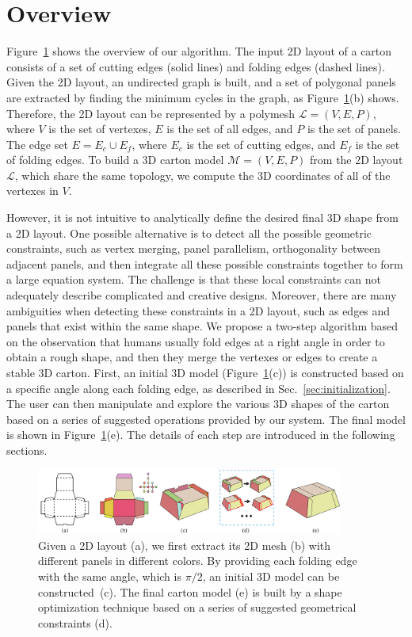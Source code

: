 \section{Overview}\label{sec:overview}


Figure~\ref{fig:overview} shows the overview of our algorithm. 
The input 2D layout of a carton consists of a set of cutting edges (solid lines) and folding edges (dashed lines).
%
Given the 2D layout, an undirected graph is built, and a set of polygonal panels are extracted by finding the minimum cycles in the graph, as Figure~\ref{fig:overview}(b) shows. 
Therefore, the 2D layout can be represented by a polymesh $\mathcal{L}=(V,E,P)$, where $V$ is the set of vertexes, $E$ is the set of all edges, and $P$ is the set of panels. 
The edge set $E=E_c\cup E_f$, where $E_c$ is the set of cutting edges, and $E_f$ is the set of folding edges.
%
To build a 3D carton model $\mathcal{M}=(V, E, P)$ from the 2D layout $\mathcal{L}$, which share the same topology, we compute the 3D coordinates of all of the vertexes in $V$. 
%

However, it is not intuitive to analytically define the desired final 3D shape from a 2D layout. 
One possible alternative is to detect all the possible geometric constraints, such as vertex merging, panel parallelism, orthogonality between adjacent panels, and then integrate all these possible constraints together to form a large equation system. 
The challenge is that these local constraints can not adequately describe complicated and creative designs. 
Moreover, there are many ambiguities when detecting these constraints in a 2D layout, such as edges and panels that exist within the same shape. 
%
We propose a two-step algorithm based on the observation that humans usually fold edges at a right angle in order to obtain a rough shape, and then they merge the vertexes or edges to create a stable 3D carton.
First, an initial 3D model (Figure~\ref{fig:overview}(c)) is constructed based on a specific angle along each folding edge, as described in Sec.~\ref{sec:initialization}.
The user can then manipulate and explore the various 3D shapes of the carton based on a series of suggested operations provided by our system. 
%
The final model is shown in Figure~\ref{fig:overview}(e).
The details of each step are introduced in the following sections. 
 
\begin{figure}
	\centering
	\includegraphics[width=0.9\textwidth]{images/overview}
	\caption{Given a 2D layout (a), we first extract its 2D mesh (b) with different panels in different colors. By providing each folding edge with the same angle, which is $\pi/2$, an initial 3D model can be constructed~(c). The final carton model (e) is built by a shape optimization technique based on a series of suggested geometrical constraints (d).}
	\label{fig:overview}
\end{figure} 
 

